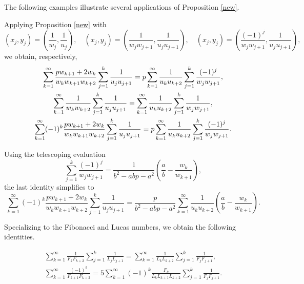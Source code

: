 \documentclass[12pt,reqno]{article}
\begin{document}
The following examples illustrate several applications of Proposition \ref{new}.
\begin{example} Applying Proposition \ref{new} with
	\[
	(x_j,y_j)
	=
	\left(\frac1{w_j},\frac1{u_j}\right),
	\quad (x_j,y_j)=
	\left(\frac1{w_jw_{j+1}},\frac1{u_ju_{j+1}}\right),
	\quad (x_j,y_j)=
	\left(\frac{(-1)^j}{w_jw_{j+1}},\frac1{u_ju_{j+1}}\right),
	\]
	we obtain, respectively,
	\begin{gather*}
	\sum_{k=1}^{\infty}
	\frac{pw_{k+1}+2w_k}
	{w_kw_{k+1}w_{k+2}}
	\sum_{j=1}^{k}
	\frac1{u_ju_{j+1}}
	=p
	\sum_{k=1}^{\infty}
	\frac1{u_ku_{k+2}}
	\sum_{j=1}^{k}
	\frac{(-1)^j}{w_jw_{j+1}},\notag\\
	\sum_{k=1}^{\infty}
	\frac1{w_kw_{k+2}}
	\sum_{j=1}^{k}
	\frac1{u_ju_{j+1}}
	=\sum_{k=1}^{\infty}
	\frac1{u_ku_{k+2}}
	\sum_{j=1}^{k}
	\frac1{w_jw_{j+1}},\notag\\
	\sum_{k=1}^{\infty}
	(-1)^k
	\frac{pw_{k+1}+2w_k}
	{w_kw_{k+1}w_{k+2}}
	\sum_{j=1}^{k}
	\frac1{u_ju_{j+1}}
	=p
	\sum_{k=1}^{\infty}
	\frac1{u_ku_{k+2}}
	\sum_{j=1}^{k}
	\frac{(-1)^j}{w_jw_{j+1}}.
	\end{gather*}
	
	Using the telescoping evaluation
	\begin{equation*}
	\sum_{j=1}^{k}
	\frac{(-1)^j}{w_jw_{j+1}}
	=
	\frac1{b^2-abp-a^2}
	\left(
	\frac{a}{b}
	-
	\frac{w_k}{w_{k+1}}
	\right),
	\end{equation*}
	the last identity simplifies to
	\begin{equation*}
	\sum_{k=1}^{\infty}
	(-1)^k
	\frac{pw_{k+1}+2w_k}
	{w_kw_{k+1}w_{k+2}}
	\sum_{j=1}^{k}
	\frac1{u_ju_{j+1}}
	=
	\frac{p}{b^2-abp-a^2}
	\sum_{k=1}^{\infty}
	\frac1{u_ku_{k+2}}
	\left(
	\frac{a}{b}
	-
	\frac{w_k}{w_{k+1}}
	\right).
	\end{equation*}
\end{example}

Specializing to the Fibonacci and Lucas numbers, we obtain the following identities.
\begin{corollary}
	\begin{gather*}
	\sum_{k=1}^{\infty}
	\frac1{F_kF_{k+2}}
	\sum_{j=1}^{k}
	\frac1{L_jL_{j+1}}
	=
	\sum_{k=1}^{\infty}
	\frac1{L_kL_{k+2}}
	\sum_{j=1}^{k}
	\frac1{F_jF_{j+1}},\\
	\sum_{k=1}^{\infty}
	\frac{(-1)^k}{F_{k+1}F_{k+2}}
	=
	5
	\sum_{k=1}^{\infty}
	(-1)^k
	\frac{F_k}{L_kL_{k+1}L_{k+2}}
	\sum_{j=1}^{k}
	\frac1{F_jF_{j+1}}.
	\end{gather*}
\end{corollary}
\end{document}
